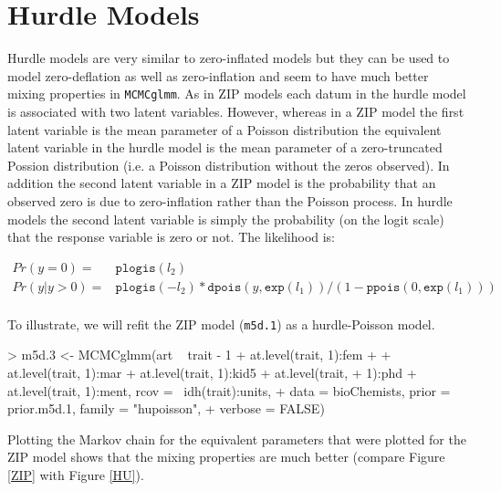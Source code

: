 \documentclass{article}
\begin{document}
\section{Hurdle Models}
\label{Hurdle}

Hurdle models are very similar to zero-inflated models but they can be used to model zero-deflation as well as zero-inflation and seem to have much better mixing properties in \texttt{MCMCglmm}.  As in ZIP models each datum in the hurdle model is associated with two latent variables. However, whereas in a ZIP model the first latent variable is the mean parameter of a Poisson distribution the equivalent latent variable in the hurdle model is the mean parameter of a zero-truncated Possion distribution (i.e. a Poisson distribution without the zeros  observed). In addition the second latent variable in a ZIP model is the probability that an observed zero is due to zero-inflation rather than the Poisson process. In hurdle models the second latent variable is simply the probability (on the logit scale) that the response variable is zero or not. The likelihood is:

\begin{equation} 
\begin{array}{rl}
Pr(y=0) =& \texttt{plogis}(l_{2})\\
Pr(y | y>0) =& \texttt{plogis}(-l_{2})\ast \texttt{dpois}(y, \texttt{exp}(l_{1}))/(1-\texttt{ppois}(0, \texttt{exp}(l_{1})))\\
\end{array}
\end{equation}

 To illustrate, we will refit the ZIP model (\texttt{m5d.1}) as a hurdle-Poisson model.

\begin{Schunk}
\begin{Sinput}
> m5d.3 <- MCMCglmm(art ~ trait - 1 + at.level(trait, 1):fem + 
+     at.level(trait, 1):mar + at.level(trait, 1):kid5 + at.level(trait, 
+     1):phd + at.level(trait, 1):ment, rcov = ~idh(trait):units, 
+     data = bioChemists, prior = prior.m5d.1, family = "hupoisson", 
+     verbose = FALSE)
\end{Sinput}
\end{Schunk}

Plotting the Markov chain for the equivalent parameters that were plotted for the ZIP model shows that the mixing properties are much better (compare Figure \ref{ZIP} with Figure \ref{HU}).\\
\end{document}
